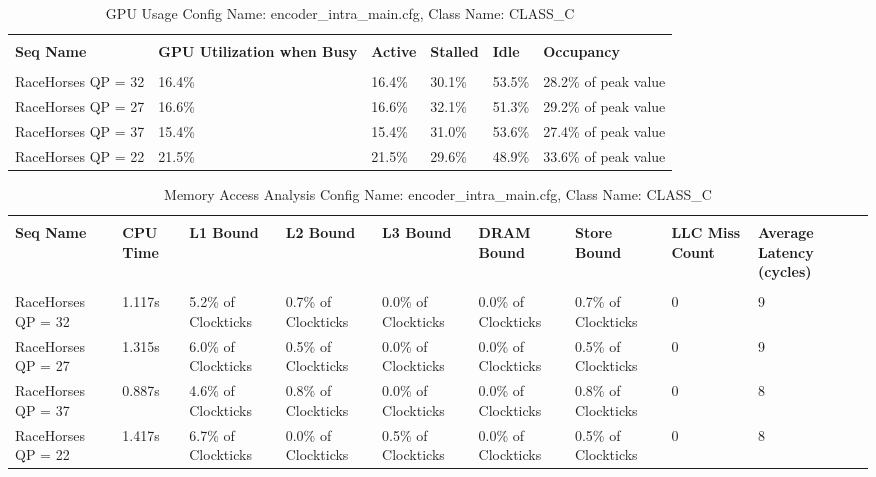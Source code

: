 \documentclass{article}%
\begin{document}
\newpage%
\begin{longtabu}{| X[l] | X[l] | X[l] | X[l] | X[l] | X[l] |}%
\caption{%
GPU Usage\newline%
 Config Name: encoder\_intra\_main.cfg,\newline%
 Class Name: CLASS\_C\newline%
%
}%
\hline%
&&&&&\\%
\textbf{Seq Name}&\textbf{GPU Utilization when Busy}&\textbf{Active}&\textbf{Stalled}&\textbf{Idle}&\textbf{Occupancy}\\%
&&&&&\\%
\hline%
\endhead%
RaceHorses\newline%
 QP = 32&16.4\%&16.4\%&30.1\%&53.5\%&28.2\% of peak value\\%
\hline%
RaceHorses\newline%
 QP = 27&16.6\%&16.6\%&32.1\%&51.3\%&29.2\% of peak value\\%
\hline%
RaceHorses\newline%
 QP = 37&15.4\%&15.4\%&31.0\%&53.6\%&27.4\% of peak value\\%
\hline%
RaceHorses\newline%
 QP = 22&21.5\%&21.5\%&29.6\%&48.9\%&33.6\% of peak value\\%
\hline%
\end{longtabu}%
\begin{longtabu}{| X[l] | X[l] | X[l] | X[l] | X[l] | X[l] | X[l] | X[l] | X[l] |}%
\caption{%
Memory Access Analysis\newline%
 Config Name: encoder\_intra\_main.cfg,\newline%
 Class Name: CLASS\_C\newline%
%
}%
\hline%
&&&&&&&&\\%
\textbf{Seq Name}&\textbf{CPU Time}&\textbf{L1 Bound}&\textbf{L2 Bound}&\textbf{L3 Bound}&\textbf{DRAM Bound}&\textbf{Store Bound}&\textbf{LLC Miss Count}&\textbf{Average Latency (cycles)}\\%
&&&&&&&&\\%
\hline%
\endhead%
RaceHorses\newline%
 QP = 32&1.117s&5.2\% of Clockticks&0.7\% of Clockticks&0.0\% of Clockticks&0.0\% of Clockticks&0.7\% of Clockticks&0&9\\%
\hline%
RaceHorses\newline%
 QP = 27&1.315s&6.0\% of Clockticks&0.5\% of Clockticks&0.0\% of Clockticks&0.0\% of Clockticks&0.5\% of Clockticks&0&9\\%
\hline%
RaceHorses\newline%
 QP = 37&0.887s&4.6\% of Clockticks&0.8\% of Clockticks&0.0\% of Clockticks&0.0\% of Clockticks&0.8\% of Clockticks&0&8\\%
\hline%
RaceHorses\newline%
 QP = 22&1.417s&6.7\% of Clockticks&0.0\% of Clockticks&0.5\% of Clockticks&0.0\% of Clockticks&0.5\% of Clockticks&0&8\\%
\hline%
\end{longtabu}%
\end{document}
